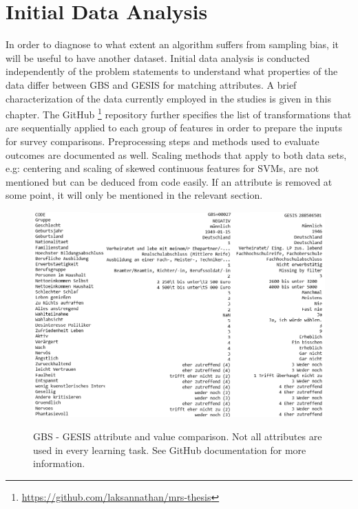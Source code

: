 \chapter{Initial Data Analysis}\label{Sec:Initial Data Analysis}

In order to diagnose to what extent an algorithm suffers from sampling bias, it will be useful to have another dataset. Initial data analysis is conducted independently of the problem statements to understand what properties of the data differ between GBS and GESIS for matching attributes. A brief characterization of the data currently employed in the studies is given in this chapter. The GitHub \footnote{\url{https://github.com/laksannathan/mrs-thesis}} repository further specifies the list of transformations that are sequentially applied to each group of features in order to prepare the inputs for survey comparisons. Preprocessing steps and methods used to evaluate outcomes are documented as well. Scaling methods that apply to both data sets, e.g: centering and scaling of skewed continuous features for SVMs, are not mentioned but can be deduced from code easily. If an attribute is removed at some point, it will only be mentioned in the relevant section.

\begin{figure}[ht]
	\begin{center}
		\captionsetup{width= 425pt}
		\includegraphics[scale=0.52,angle=0]{fig/values_compare}
		\label{std}
		\caption{GBS - GESIS attribute and value comparison. Not all attributes are used in every learning task. See GitHub documentation for more information.}
	\end{center}
\end{figure}

